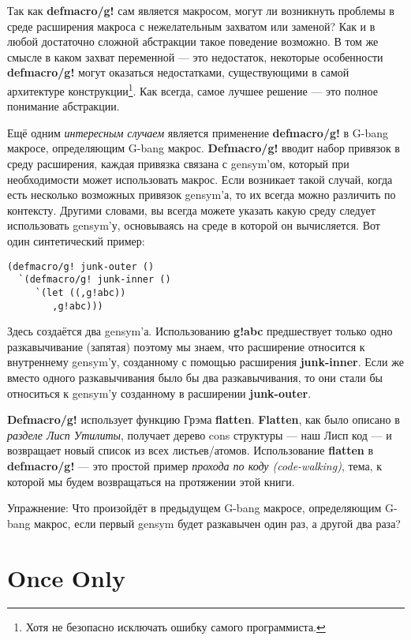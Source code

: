 Так как \textbf{defmacro/g!} сам является макросом, могут ли возникнуть проблемы в среде расширения макроса с нежелательным захватом или заменой? Как и в любой достаточно сложной абстракции такое поведение возможно. В том же смысле в каком захват переменной --- это недостаток, некоторые особенности \textbf{defmacro/g!} могут оказаться недостатками, существующими в самой архитектуре конструкции\footnote{Хотя не безопасно исключать ошибку самого программиста.}. Как всегда, самое лучшее решение --- это полное понимание абстракции.

Ещё одним \emph{интересным случаем} является применение \textbf{defmacro/g!} в G-bang макросе, определяющим G-bang макрос. \textbf{Defmacro/g!} вводит набор привязок в среду расширения, каждая привязка связана с gensym'ом, который при необходимости может использовать макрос. Если возникает такой случай, когда есть несколько возможных привязок gensym'а, то их всегда можно различить по контексту. Другими словами, вы всегда можете указать какую среду следует использовать gensym'у, основываясь на среде в которой он вычисляется. Вот один синтетический пример:

\begin{verbatim}
(defmacro/g! junk-outer ()
  `(defmacro/g! junk-inner ()
     `(let ((,g!abc))
        ,g!abc)))
\end{verbatim}

Здесь создаётся два gensym'а. Использованию \textbf{g!abc} предшествует только одно разкавычивание (запятая) поэтому мы знаем, что расширение относится к внутреннему gensym'у, созданному с помощью расширения \textbf{junk-inner}. Если же вместо одного разкавычивания было бы два разкавычивания, то они стали бы относиться к gensym'у созданному в расширении \textbf{junk-outer}.

\textbf{Defmacro/g!} использует функцию Грэма \textbf{flatten}. \textbf{Flatten}, как было описано в \emph{разделе Лисп Утилиты}, получает дерево cons структуры --- наш Лисп код --- и возвращает новый список из всех листьев/атомов. Использование \textbf{flatten} в \textbf{defmacro/g!} --- это простой пример \emph{прохода по коду (code-walking)}, тема, к которой мы будем возвращаться на протяжении этой книги.

Упражнение: Что произойдёт в предыдущем G-bang макросе, определяющим G-bang макрос, если первый gensym будет разкавычен один раз, а другой два раза?

\section{Once Only}\label{section_once_only}


